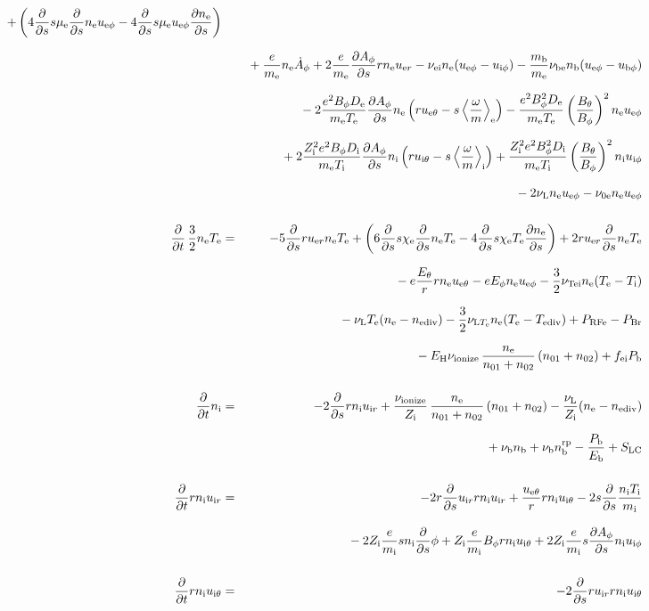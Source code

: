 \documentclass[11pt]{article}
\def\r#1{{\rm#1}}
\def\ddt{\frac{\partial}{\partial t}}
\def\dds{\frac{\partial}{\partial s}}
\def\dd#1{\frac{\partial #1}{\partial s}}
\def\ave#1{\left\langle#1\right\rangle}
\def\me{m_\r{e}}
\def\mi{m_\r{i}}
\def\mb{m_\r{b}}
\def\mue{\mu_\r{e}}
\def\De{D_\r{e}}
\def\Di{D_\r{i}}
\def\chie{\chi_\r{e}}
\def\ne{n_\r{e}}
\def\ni{n_\r{i}}
\def\nb{n_\r{b}}
\def\uer{u_{\r{e}r}}
\def\uir{u_{\r{i}r}}
\def\ueth{u_{\r{e}\theta}}
\def\uith{u_{\r{i}\theta}}
\def\ueph{u_{\r{e}\phi}}
\def\uiph{u_{\r{i}\phi}}
\def\ubph{u_{\r{b}\phi}}
\def\Eth{E_\theta}
\def\Eph{E_\phi}
\def\Bth{B_\theta}
\def\Bph{B_\phi}
\def\Aphd{\dot{A}_\phi}
\def\Aph{A_\phi}
\def\Te{T_\r{e}}
\def\Ti{T_\r{i}}
\def\nna{n_{01}}
\def\nnb{n_{02}}
\def\Zi{Z_\r{i}}
\def\Pb{P_\r{b}}
\def\Eb{E_\r{b}}
\def\PRFe{P_\r{RFe}}
\def\PBr{P_\r{Br}}
\def\EH{E_\r{H}}
\def\fei{f_\r{ei}}
\def\nbrp{n_\r{b}^\r{rp}}
\def\nuei{\nu_\r{ei}}
\def\nube{\nu_\r{be}}
\def\nune{\nu_\r{0e}}
\def\nuL{\nu_\r{L}}
\def\nuion{\nu_\r{ionize}}
\def\nub{\nu_\r{b}}
\def\nuTei{\nu_\r{Tei}}
\def\vb{v_\r{b}}
\def\nediv{n_\r{ediv}}
\def\Tediv{T_\r{ediv}}
\def\nuLTe{\nu_{\r{L}T_\r{e}}}
\begin{document}
\begin{eqnarray}
%
  + \left(   4 \dds s \mue \dds \ne \ueph
%
           - 4 \dds s \mue \ueph \dd{\ne} \right)
\nonumber\\[2.5mm]&&{}
%
  + \frac{e}{\me} \ne \Aphd
%
  + 2 \frac{e}{\me} \dd{\Aph} r \ne \uer 
%
  - \nuei \ne (\ueph - \uiph)
%
  - \frac{\mb}{\me} \nube \nb (\ueph - \ubph)
\nonumber\\[2.5mm]&&{}
%
  - 2\frac{e^2 \Bph \De}{\me\Te}\dd{\Aph}\ne
    \left(r \ueth - s \ave{\frac{\omega}{m}}_\r{e} \right)
  - \frac{e^2 \Bph^2 \De}{\me\Te}\left(\frac{\Bth}{\Bph}\right)^2\ne\ueph
\nonumber\\[2.5mm]&&{}
%
   + 2\frac{\Zi^2 e^2 \Bph \Di}{\me\Ti}\dd{\Aph}\ni
    \left(r \uith - s \ave{\frac{\omega}{m}}_\r{i} \right)
   + \frac{\Zi^2 e^2 \Bph^2
   \Di}{\me\Ti}\left(\frac{\Bth}{\Bph}\right)^2\ni\uiph
\nonumber\\[2.5mm]&&{}
%
  - 2 \nuL \ne \ueph
%
  - \nune \ne \ueph
%
%
\\[5mm]
%
%
  \ddt \, \frac{3}{2} \ne \Te &=&
%
   - 5 \dds r \uer \ne \Te
%
   + \left(   6 \dds s \chie \dds \ne \Te
%
            - 4 \dds s \chie \Te \dd{\ne} \right)
%
  + 2 r \uer \dds \ne \Te
%
\nonumber\\[2.5mm]&&{}
%
  -  e \frac{\Eth}{r} r \ne \ueth
%
  -  e \Eph \ne \ueph 
%
  - \frac{3}{2} \nuTei \ne (\Te - \Ti)
%
%
\nonumber\\[2.5mm]&&{}
%
  - \nuL \Te (\ne - \nediv)
%
  - \frac{3}{2} \nuLTe \ne (\Te - \Tediv)
%
  + \PRFe
%
  - \PBr
\nonumber\\[2.5mm]&&{}
%
  - \EH \nuion\, \frac{\ne}{\nna+\nnb}\, (\nna+\nnb)
%
  + \fei \Pb
\\[5mm]
%
%
  \ddt \ni &=&
%
  - 2 \dds r \ni \uir
%
  + \frac{\nuion}{\Zi}\, \frac{\ne}{\nna+\nnb}\, (\nna+\nnb)
%
  - \frac{\nuL}{\Zi} (\ne - \nediv) 
\nonumber\\[2.5mm]&&{}
%
  + \nub \nb
%
  + \nub \nbrp
%
  - \frac{\Pb}{\Eb}
%
  + S_\r{LC}
\\[5mm]
%
%
  \ddt r \ni \uir &=&
%
  - 2 r \dds \uir r \ni \uir
%
  + \frac{\ueth}{r} r \ni \uith
%
  - 2 s \dds \frac{\ni \Ti}{\mi}
\nonumber\\[3mm]&&{}
%
  - 2 \Zi \frac{e}{\mi} s \ni \dds \phi
%
  + \Zi \frac{e}{\mi} \Bph r \ni \uith
%
  + 2 \Zi \frac{e}{\mi} s \dd{\Aph} \ni \uiph
\\[5mm]
%
%
  \ddt r \ni \uith &=&
%
  - 2 \dds r \uir r \ni \uith

\end{eqnarray}
\end{document}
